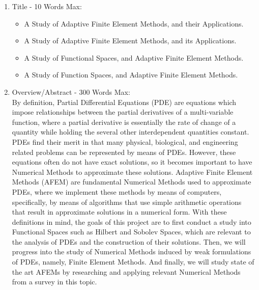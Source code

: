 \documentclass[11pt]{article}
\begin{document}
\pagestyle{fancy}
\fancyhead{}
\fancyhead[L]{\textbf{\rightmark}}

\begin{enumerate}

\item Title - 10 Words Max:
\begin{itemize}
\item A Study of Adaptive Finite Element Methods, and their Applications.
\item A Study of Adaptive Finite Element Methods, and its Applications.
\item A Study of Functional Spaces, and Adaptive Finite Element Methods.
\item A Study of Function Spaces, and Adaptive Finite Element Methods.
\end{itemize}

\item Overview/Abstract - 300 Words Max: \\
By definition, Partial Differential Equations (PDE) are equations which impose relationships
between the partial derivatives of a multi-variable function, where a partial derivative is
essentially the rate of change of a quantity while holding the several other interdependent quantities constant.
PDEs find their merit in that many physical, biological, and engineering related problems can be represented by means of PDEs.
However, these equations often do not have exact solutions, so it becomes important to have Numerical Methods to approximate these solutions.
Adaptive Finite Element Methods (AFEM)
are fundamental Numerical Methods used to approximate PDEs, where we implement these methods by means of computers, specifically, by means
of algorithms that use simple arithmetic operations that result in approximate solutions in a numerical form.
With these definitions in mind, the goals of this project are to first conduct a study into Functional Spaces such as
Hilbert and Sobolev Spaces, which are relevant to the analysis of PDEs and the construction of their solutions.
Then, we will progress into the study of Numerical Methods induced by weak formulations
of PDEs, namely, Finite Element Methods. And finally, we will study state of the art AFEMs
by researching and applying relevant Numerical Methods from a survey in this topic.


\end{enumerate}
\end{document}
